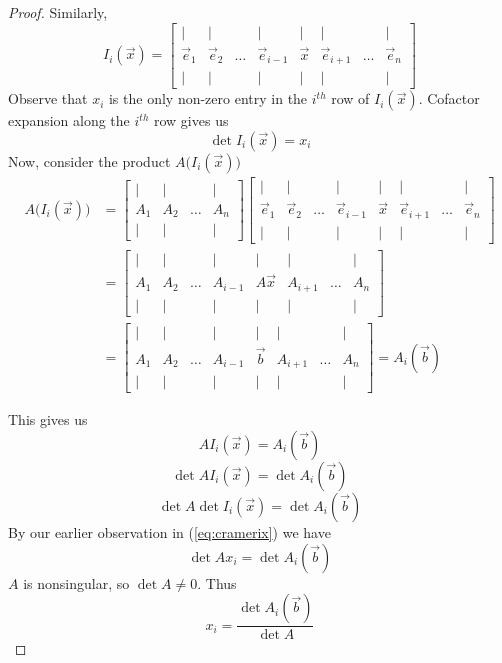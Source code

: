 \documentclass{ximera}
\begin{document}
\begin{proof}
Similarly,
$$I_i(\vec{x})=\begin{bmatrix}
           | & |& &|&|&|&&|\\
		\vec{e}_1 & \vec{e}_2&\dots &\vec{e}_{i-1}&\vec{x}&\vec{e}_{i+1}&\dots&\vec{e}_n\\
		| & |& &|&|&|&&|
         \end{bmatrix}$$
         Observe that $x_i$ is the only non-zero entry in the $i^{th}$ row of $I_i(\vec{x})$.  Cofactor expansion along the $i^{th}$ row gives us 
         \begin{equation}\label{eq:cramerix}\det{I_i(\vec{x})}=x_i\end{equation}
Now, consider the product $A\Big(I_i(\vec{x})\Big)$
\begin{align*}A\Big(I_i(\vec{x})\Big)&=\begin{bmatrix}
           | & |& &|\\
		A_1 & A_2&\dots&A_n\\
		| & |& &|
         \end{bmatrix}\begin{bmatrix}
           | & |& &|&|&|&&|\\
		\vec{e}_1 & \vec{e}_2&\dots &\vec{e}_{i-1}&\vec{x}&\vec{e}_{i+1}&\dots&\vec{e}_n\\
		| & |& &|&|&|&&|
         \end{bmatrix}\\
         &=\begin{bmatrix}
           | & |& &|&|&|&&|\\
		A_1 & A_2&\dots &A_{i-1}&A\vec{x}&A_{i+1}&\dots&A_n\\
		| & |& &|&|&|&&|
         \end{bmatrix}\\
         &=\begin{bmatrix}
           | & |& &|&|&|&&|\\
		A_1 & A_2&\dots &A_{i-1}&\vec{b}&A_{i+1}&\dots&A_n\\
		| & |& &|&|&|&&|
         \end{bmatrix}=A_i(\vec{b})
\end{align*}

This gives us 
$$AI_i(\vec{x})=A_i(\vec{b})$$
$$\det{AI_i(\vec{x})}=\det{A_i(\vec{b})}$$
$$\det{A}\det{I_i(\vec{x})}=\det{A_i(\vec{b})}$$
By our earlier observation in (\ref{eq:cramerix}) we have
$$\det{A}x_i=\det{A_i(\vec{b})}$$
$A$ is nonsingular, so $\det{A}\neq 0$.  Thus
$$x_i=\frac{\det{A_i(\vec{b})}}{\det{A}}$$
\end{proof}
\end{document}
